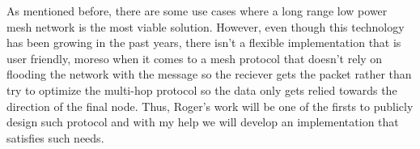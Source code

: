 As mentioned before, there are some use cases where a long range low power mesh network is the most viable solution. However, even though this technology has been growing in the past years, there isn't a flexible implementation that is user friendly, moreso when it comes to a mesh protocol that doesn't rely on flooding the network with the message so the reciever gets the packet\cite{MeshtasticProto} rather than try to optimize the multi-hop protocol so the data only gets relied towards the direction of the final node. Thus, Roger's work will be one of the firsts to publicly design such protocol and with my help we will develop an implementation that satisfies such needs.


